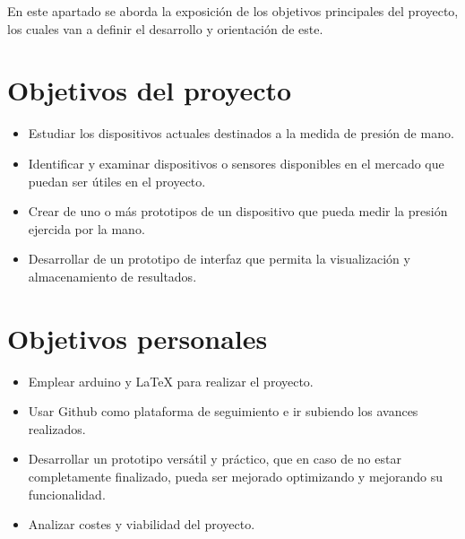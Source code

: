 En este apartado se aborda la exposición de los objetivos principales del proyecto, los cuales van a definir el desarrollo y orientación de este.
\section{Objetivos del proyecto}
\begin{itemize}
    \item Estudiar los dispositivos actuales destinados a la medida de presión de mano.
    \item Identificar y examinar dispositivos o sensores disponibles en el mercado que puedan ser útiles en el proyecto.
    \item Crear de uno o más prototipos de un dispositivo que pueda medir la presión ejercida por la mano.
    \item Desarrollar de un prototipo de interfaz que permita la visualización y almacenamiento de resultados.
\end{itemize}
\section{Objetivos personales}
\begin{itemize}
    \item Emplear arduino y LaTeX para realizar el proyecto. 
    \item Usar Github como plataforma de seguimiento e ir subiendo los avances realizados.
    \item Desarrollar un prototipo versátil y práctico, que en caso de no estar completamente finalizado, pueda ser mejorado optimizando y mejorando su funcionalidad.
    \item Analizar costes y viabilidad del proyecto.  
\end{itemize}